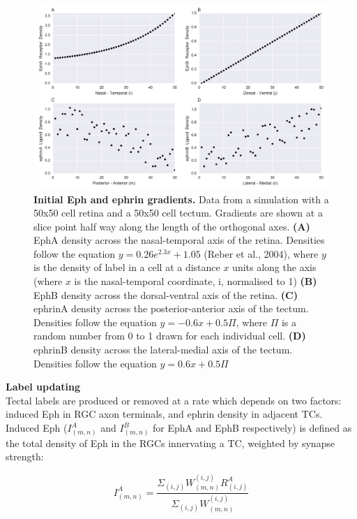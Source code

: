 \documentclass[11pt]{"article"}
\begin{document}
\begin{figure}[!h]
\includegraphics[scale=0.6]{Gradients}
\caption{\textbf{Initial Eph and ephrin gradients.} 
Data from a simulation with a 50x50 cell retina and a 50x50 cell tectum. Gradients are shown at a slice point half way along the length of the orthogonal axes. 
\textbf{(A)} EphA density across the nasal-temporal axis of the retina. Densities follow the equation $y = 0.26e^{2.3x} + 1.05$ (Reber et al., 2004), where $y$ is the density of label in a cell at a distance $x$ units along the axis (where $x$ is the nasal-temporal coordinate, i, normalised to 1)
\textbf{(B)} EphB density across the dorsal-ventral axis of the retina. \textbf{(C)} ephrinA density across the posterior-anterior axis of the tectum. Densities follow the equation $y = -0.6x + 0.5\Pi$, where $\Pi$ is a random number from 0 to 1 drawn for each individual cell. 
\textbf{(D)} ephrinB density across the lateral-medial axis of the tectum. Densities follow the equation $y = 0.6x + 0.5\Pi$}
\end{figure}

\pagebreak

\textbf{Label updating}\\
Tectal labels are produced or removed at a rate which depends on two factors: induced Eph in RGC axon terminals, and ephrin density in adjacent TCs. Induced Eph ($I_{(m,n)}^A$ and $I_{(m,n)}^B$ for EphA and EphB respectively) is defined as the total density of Eph in the RGCs innervating a TC, weighted by synapse strength:

\begin{equation}
I_{(m,n)}^A = \frac{\Sigma_{(i,j)} W^{(i,j)}_{(m,n)} R_{(i,j)}^A}{\Sigma_{(i,j)} W^{(i,j)}_{(m,n)}}
\end{equation} 
\end{document}
